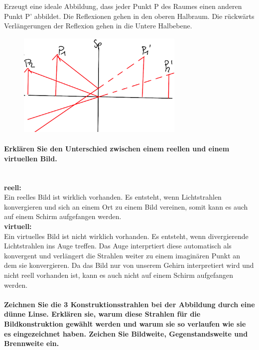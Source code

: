 \documentclass[a4paper, 11pt, ngerman, parskip=half-]{scrartcl}
\begin{document}
Erzeugt eine ideale Abbildung, dass jeder Punkt P des Raumes einen anderen Punkt P' abbildet. Die Reflexionen gehen in den oberen Halbraum.  Die rückwärts Verlängerungen der Reflexion gehen in die Untere Halbebene.

\begin{figure}[H]
    \centering
    \includegraphics[width=8cm]{image/17/geo12}
\end{figure}

\paragraph{Erklären Sie den Unterschied zwischen einem reellen und einem virtuellen Bild.}~\\

\textbf{reell:}\\
Ein reelles Bild ist wirklich vorhanden. Es entsteht, wenn Lichtstrahlen konvergieren und sich an einem Ort zu einem Bild vereinen, somit kann es auch auf einem
Schirm aufgefangen werden.\\

\textbf{virtuell:}\\
Ein virtuelles Bild ist nicht wirklich vorhanden. Es entsteht, wenn divergierende Lichtstrahlen ins Auge treffen. Das Auge interprtiert diese automatisch als
konvergent und verlängert die Strahlen weiter zu einem imaginären Punkt an dem sie konvergieren. Da das Bild nur von unserem Gehirn interpretiert wird und nicht
reell vorhanden ist, kann es auch nicht auf einem Schirm aufgefangen werden.


\paragraph{Zeichnen Sie die 3 Konstruktionsstrahlen bei der Abbildung durch eine dünne Linse.
    Erklären sie, warum diese Strahlen für die Bildkonstruktion gewählt werden und warum sie so
    verlaufen wie sie es eingezeichnet haben. Zeichen Sie Bildweite, Gegenstandsweite und Brennweite
    ein.}~\\
\end{document}
